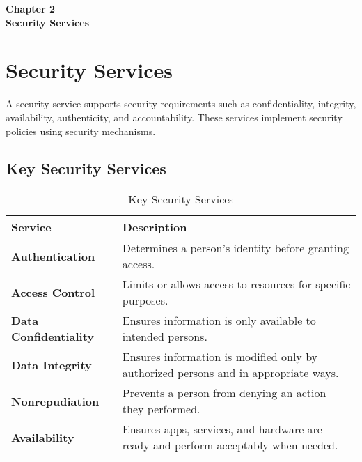 \clearpage
\thispagestyle{empty} 
\begin{center}
    \vspace*{\fill} 
    \Huge \textbf{Chapter 2} \\
    \Huge \textbf{Security Services} 
    \vspace*{\fill}
\end{center}
\clearpage

\chapter{Security Services}

A security service supports security requirements such as confidentiality, integrity, availability, authenticity, and accountability. These services implement security policies using security mechanisms.

\section{Key Security Services}
\begin{table}[h!]
    \centering
\begin{tabular}{|p{3.5cm}|p{9cm}|}
    \hline
    \textbf{Service} & \textbf{Description} \\ \hline
    \textbf{Authentication} & Determines a person’s identity before granting access. \\ \hline
    \textbf{Access Control} & Limits or allows access to resources for specific purposes. \\ \hline
\textbf{Data Confidentiality} & Ensures information is only available to intended persons.
 \\ \hline
    \textbf{Data Integrity} & Ensures information is modified only by authorized persons and in appropriate ways. \\ \hline
    \textbf{Nonrepudiation} & Prevents a person from denying an action they performed. \\ \hline
    \textbf{Availability} & Ensures apps, services, and hardware are ready and perform acceptably when needed. \\ \hline
\end{tabular}
\caption{Key Security Services}
\end{table}
